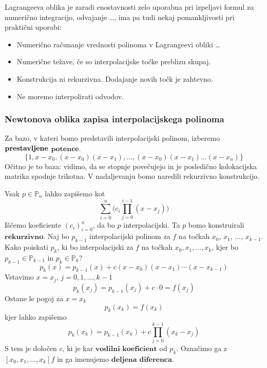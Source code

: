 \documentclass[a4paper,12pt]{article}
\theoremstyle{definition}
\theoremstyle{remark}
\newcommand{\Pp}{\mathbb{P}}
\begin{document}
Lagrangeeva oblika je zaradi enostavnosti zelo uporabna pri izpeljavi formul za numerično integracijo, odvajanje \dots, ima pa tudi nekaj pomankljivosti pri praktični uporabi:
\begin{itemize}
    \item Numerično računanje vrednosti polinoma v Lagrangeevi obliki \dots
    \item Numerične težave, če so interpolacijske točke preblizu skupaj.
    \item Konstrukcija ni rekurzivna. Dodajanje novih točk je zahtevno.
    \item Ne moremo interpolirati odvodov.
\end{itemize}

\subsubsection{Newtonova oblika zapisa interpolacijskega polinoma}
Za bazo, v kateri bomo predstavili interpolacijski polinom, izberemo $\\ \textbf{prestavljene}$ $\textbf{potence}$. %
\begin{equation*}
    \{1, x-x_0, (x-x_0)(x-x_1), \dots, (x-x_0) (x-x_1) \dots (x-x_n)\}
\end{equation*}
Očitno je to baza: vidimo, da se stopnje povečujejo in je posledično kolokacijska matrika spodnje trikotna. V nadaljevanju bomo naredili rekurzivno konstrukcijo.

Vsak $p \in \Pp_n$ lahko zapišemo kot 
\begin{equation*}
    \sum_{i = 0}^{n} \bigl( c_i \prod_{j = 0}^{i-1} (x-x_j) \bigr)
\end{equation*}
Iščemo koeficiente $(c_i)_{i=0}^n$, da bo $p$ interpolacijski.
Ta $p$ bomo konstruirali $\textbf{rekurzivno}$.
Naj bo $p_{k-1}$ interpolacijski polinom za $f$ na točkah $x_0$, $x_1$, $\dots$, $x_{k-1}$. Kako poiskati $p_k$, ki bo interpolacijski za $f$ na točkah
$x_0, x_1, \dots, x_k$, kjer bo $p_{k-1} \in \Pp_{k-1} \text{ in } p_k \in \Pp_k$?
\begin{equation*}
    p_k (x) = p_{k-1}(x) + c (x-x_0)(x-x_1)\cdots(x-x_{k-1})
\end{equation*}
Vstavimo $x = x_j$, $j = 0, 1, \dots, k-1$
\begin{equation*}
    p_k(x_j) = p_{k-1}(x_j) + c \cdot 0 = f(x_j)
\end{equation*}
Ostane le pogoj za $x = x_k$
\begin{equation*}
    p_k(x_k) = f(x_k)
\end{equation*}
kjer lahko zapišemo
\begin{equation*}
    p_k(x_k) = p_{k-1}(x_k) +  c \prod_{j = 0}^{k-1}(x_k - x_j)
\end{equation*}
S tem je določen $c$, ki je kar $\textbf{vodilni koeficient}$ od $p_k$. Označimo ga z $[x_0, x_1, \dots, x_k] f$ in ga imenujemo $\textbf{deljena diferenca}$.
\end{document}
